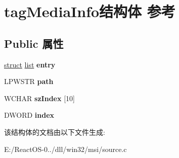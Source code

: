 \hypertarget{structtag_media_info}{}\section{tag\+Media\+Info结构体 参考}
\label{structtag_media_info}
\subsection*{Public 属性}
\begin{DoxyCompactItemize}
\item 
\mbox{\label{structtag_media_info_a3f45d3b99f69c4dc53a78cd6edb17dc5}} 
\hyperlink{interfacestruct}{struct} \hyperlink{classlist}{list} {\bfseries entry}
\item 
\mbox{\label{structtag_media_info_a6367025b08779c7318b230d2dfeb281e}} 
L\+P\+W\+S\+TR {\bfseries path}
\item 
\mbox{\label{structtag_media_info_a7da0ac26360dc28c69b670d1154bcced}} 
W\+C\+H\+AR {\bfseries sz\+Index} \mbox{[}10\mbox{]}
\item 
\mbox{\label{structtag_media_info_a64c0d72b600654f5146f8fea9504b216}} 
D\+W\+O\+RD {\bfseries index}
\end{DoxyCompactItemize}


该结构体的文档由以下文件生成\+:\begin{DoxyCompactItemize}
\item 
E\+:/\+React\+O\+S-\/0../dll/win32/msi/source.\+c\end{DoxyCompactItemize}
